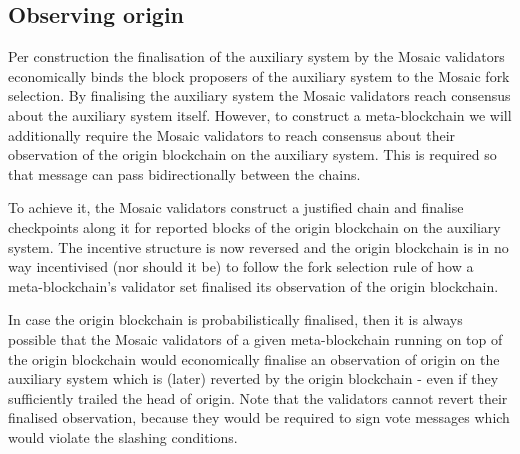 \documentclass[12pt,a4paper]{article}
\begin{document}

\subsection{Observing origin}
\label{observing_origin}

Per construction the finalisation of the auxiliary system by the Mosaic validators economically binds the block proposers of the auxiliary system to the Mosaic fork selection.
By finalising the auxiliary system the Mosaic validators reach consensus about the auxiliary system itself.
However, to construct a meta-blockchain we will additionally require the Mosaic validators to reach consensus about their observation of the origin blockchain on the auxiliary system.
This is required so that message can pass bidirectionally between the chains.

To achieve it, the Mosaic validators construct a justified chain and finalise checkpoints along it for reported blocks of the origin blockchain on the auxiliary system.
The incentive structure is now reversed and the origin blockchain is in no way incentivised (nor should it be) to follow the fork selection rule of how a meta-blockchain's validator set finalised its observation of the origin blockchain.

In case the origin blockchain is probabilistically finalised, then it is always possible that the Mosaic validators of a given meta-blockchain running on top of the origin blockchain would economically finalise an observation of origin on the auxiliary system which is (later) reverted by the origin blockchain - even if they sufficiently trailed the head of origin.
Note that the validators cannot revert their finalised observation, because they would be required to sign vote messages which would violate the slashing conditions.
\end{document}
